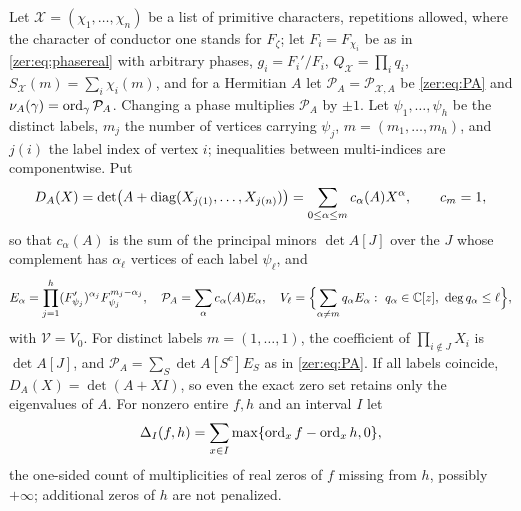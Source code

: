 Let $\mathcal X=(\chi_1,\dots,\chi_n)$ be a list of primitive characters, repetitions allowed, where
the character of conductor one stands for $F_\zeta$; let $F_i=F_{\chi_i}$ be as in
\eqref{zer:eq:phasereal} with arbitrary phases, $g_i=F_i'/F_i$, $Q_{\mathcal X}=\prod_iq_i$,
$S_{\mathcal X}(m)=\sum_i\chi_i(m)$, and for a Hermitian $A$ let $\mathcal P_A=\mathcal P_{\mathcal X,A}$ be
\eqref{zer:eq:PA} and $\nu_A(\gamma)=\operatorname{ord}_\gamma\mathcal P_A$. Changing a phase multiplies $\mathcal P_A$ by
$\pm1$. Let $\psi_1,\dots,\psi_h$ be the distinct labels, $m_j$ the number of vertices carrying $\psi_j$,
$m=(m_1,\dots,m_h)$, and $j(i)$ the label index of vertex $i$; inequalities between multi-indices are
componentwise. Put
\begin{equation}\label{zer:eq:groupD}
 D_A(X)=\det\bigl(A+\operatorname{diag}(X_{j(1)},\dots,X_{j(n)})\bigr)=\sum_{0\le\alpha\le m}c_\alpha(A)X^\alpha,\qquad c_m=1,
\end{equation}
so that $c_\alpha(A)$ is the sum of the principal minors $\det A[J]$ over the $J$ whose complement has
$\alpha_\ell$ vertices of each label $\psi_\ell$, and
\[
 E_\alpha=\prod_{j=1}^h(F'_{\psi_j})^{\alpha_j}F_{\psi_j}^{m_j-\alpha_j},\quad
 \mathcal P_A=\sum_\alpha c_\alpha(A)E_\alpha,\quad
 V_\ell=\Bigl\{\sum_{\alpha\ne m}q_\alpha E_\alpha:\ q_\alpha\in\C[z],\ \deg q_\alpha\le\ell\Bigr\},
\]
with $\mathcal V=V_0$. For distinct labels $m=(1,\dots,1)$, the coefficient of $\prod_{i\notin J}X_i$ is
$\det A[J]$, and $\mathcal P_A=\sum_S\det A[S^c]E_S$ as in \eqref{zer:eq:PA}. If all labels coincide,
$D_A(X)=\det(A+XI)$, so even the exact zero set retains only the eigenvalues of $A$. For nonzero entire
$f,h$ and an interval $I$ let
\[
 \Delta_I(f,h)=\sum_{x\in I}\max\{\operatorname{ord}_xf-\operatorname{ord}_xh,0\},
\]
the one-sided count of multiplicities of real zeros of $f$ missing from $h$, possibly $+\infty$;
additional zeros of $h$ are not penalized.

